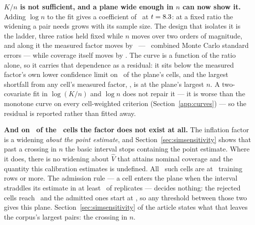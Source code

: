 \textbf{$K/n$ is not sufficient, and a plane wide enough in $n$ can now show
it.} Adding $\log n$ to the fit gives a coefficient of
\planeNdependenceBeta\ at $t = 8.3$: at a fixed ratio the
widening a pair needs grows with its sample size. The design that isolates it
is the ladder, three ratios held fixed while $n$ moves over two orders of
magnitude, and along it the measured factor moves by \ladderSpreadMax\ ---
\ladderSpreadSE\ combined Monte Carlo standard errors --- while coverage
itself moves by \ladderCoverageSpreadPts. The curve is a function of
the ratio alone, so it carries that dependence as a residual: it sits below
the measured factor's own lower confidence limit on \nCellsUnderApplied\ of
the plane's cells, and the largest shortfall from any cell's measured factor,
\maxShortfallApplied, is at the plane's largest $n$. A two-covariate fit in $\log(K/n)$ and $\log n$ does not repair it
--- it is worse than the monotone curve on every cell-weighted criterion
(Section~\ref{app:curves}) --- so the residual is reported rather
than fitted away.

\textbf{And on \nPlaneCellsUndefined\ of the \nPlaneCellsOffered\ cells the
factor does not exist at all.} The inflation factor is a widening \emph{about
the point estimate}, and Section~\ref{sec:simsensitivity} shows that past a
crossing in $n$ the basic interval stops containing the point estimate. Where it does,
there is no widening about $\hat{V}$ that attains nominal coverage and the
quantity this calibration estimates is undefined. All
\nPlaneCellsUndefined\ such cells are at \nStraddleHalfMin\ training rows or
more. The admission rule --- a cell enters the plane when the interval
straddles its estimate in at least \straddleMin\ of replicates --- decides
nothing: the rejected cells reach \straddleGapLo\ and the admitted ones start
at \straddleGapHi, so any threshold between those two gives this plane.
Section~\ref{sec:simsensitivity} of the article states what that leaves the
corpus's largest pairs: the crossing in $n$.

